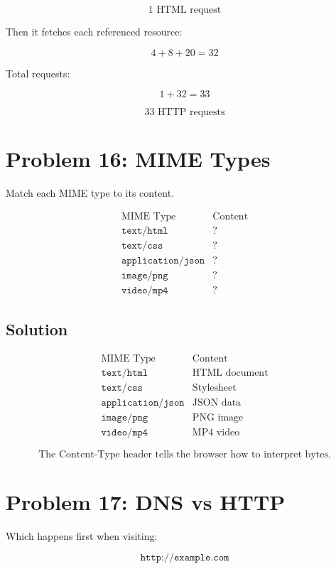 \documentclass[12pt]{article}
\begin{document}
\[
1 \text{ HTML request}
\]

Then it fetches each referenced resource:

\[
4 + 8 + 20 = 32
\]

Total requests:

\[
1 + 32 = 33
\]

\[
\boxed{33 \text{ HTTP requests}}
\]

\section*{Problem 16: MIME Types}

Match each MIME type to its content.

\[
\begin{array}{c|c}
\text{MIME Type} & \text{Content} \\
\hline
\texttt{text/html} & ? \\
\texttt{text/css} & ? \\
\texttt{application/json} & ? \\
\texttt{image/png} & ? \\
\texttt{video/mp4} & ?
\end{array}
\]

\subsection*{Solution}

\[
\begin{array}{c|c}
\text{MIME Type} & \text{Content} \\
\hline
\texttt{text/html} & \text{HTML document} \\
\texttt{text/css} & \text{Stylesheet} \\
\texttt{application/json} & \text{JSON data} \\
\texttt{image/png} & \text{PNG image} \\
\texttt{video/mp4} & \text{MP4 video}
\end{array}
\]

\[
\boxed{\text{The Content-Type header tells the browser how to interpret bytes.}}
\]

\section*{Problem 17: DNS vs HTTP}

Which happens first when visiting:

\[
\texttt{http://example.com}
\]
\end{document}
